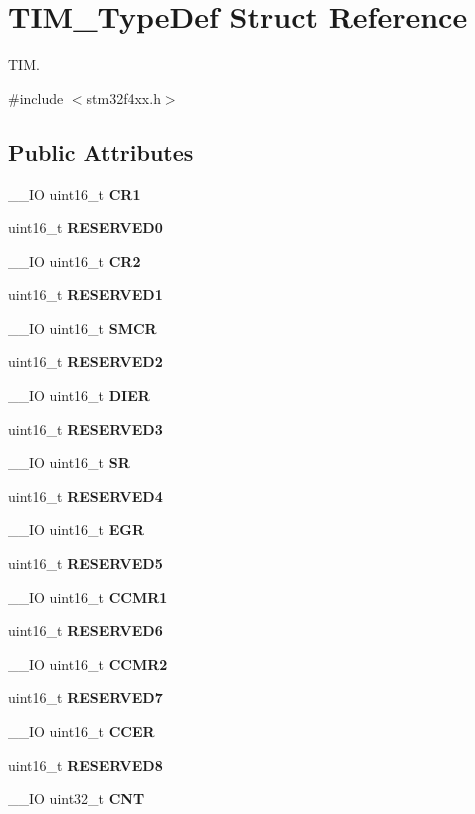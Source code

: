 \section{T\+I\+M\+\_\+\+Type\+Def Struct Reference}
\label{structTIM__TypeDef}


T\+IM.  




{\ttfamily \#include $<$stm32f4xx.\+h$>$}

\subsection*{Public Attributes}
\begin{DoxyCompactItemize}
\item 
\+\_\+\+\_\+\+IO uint16\+\_\+t \textbf{ C\+R1}
\item 
uint16\+\_\+t \textbf{ R\+E\+S\+E\+R\+V\+E\+D0}
\item 
\+\_\+\+\_\+\+IO uint16\+\_\+t \textbf{ C\+R2}
\item 
uint16\+\_\+t \textbf{ R\+E\+S\+E\+R\+V\+E\+D1}
\item 
\+\_\+\+\_\+\+IO uint16\+\_\+t \textbf{ S\+M\+CR}
\item 
uint16\+\_\+t \textbf{ R\+E\+S\+E\+R\+V\+E\+D2}
\item 
\+\_\+\+\_\+\+IO uint16\+\_\+t \textbf{ D\+I\+ER}
\item 
uint16\+\_\+t \textbf{ R\+E\+S\+E\+R\+V\+E\+D3}
\item 
\+\_\+\+\_\+\+IO uint16\+\_\+t \textbf{ SR}
\item 
uint16\+\_\+t \textbf{ R\+E\+S\+E\+R\+V\+E\+D4}
\item 
\+\_\+\+\_\+\+IO uint16\+\_\+t \textbf{ E\+GR}
\item 
uint16\+\_\+t \textbf{ R\+E\+S\+E\+R\+V\+E\+D5}
\item 
\+\_\+\+\_\+\+IO uint16\+\_\+t \textbf{ C\+C\+M\+R1}
\item 
uint16\+\_\+t \textbf{ R\+E\+S\+E\+R\+V\+E\+D6}
\item 
\+\_\+\+\_\+\+IO uint16\+\_\+t \textbf{ C\+C\+M\+R2}
\item 
uint16\+\_\+t \textbf{ R\+E\+S\+E\+R\+V\+E\+D7}
\item 
\+\_\+\+\_\+\+IO uint16\+\_\+t \textbf{ C\+C\+ER}
\item 
uint16\+\_\+t \textbf{ R\+E\+S\+E\+R\+V\+E\+D8}
\item 
\+\_\+\+\_\+\+IO uint32\+\_\+t \textbf{ C\+NT}
\item 

\end{DoxyCompactItemize}
